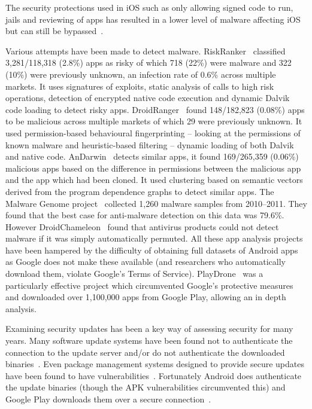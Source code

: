 \documentclass[conference,a4paper,twoside]{IEEEtran}
\begin{document}
The security protections used in iOS such as only allowing signed code to run, jails and reviewing of apps has resulted in a lower level of malware affecting iOS~\cite{TODO} but can still be bypassed~\cite{Wang2013a}. %

Various attempts have been made to detect malware.
RiskRanker~\cite{Grace2012a} classified 3,281/118,318 (2.8\%) apps as risky of which 718 (22\%) were malware and 322 (10\%) were previously unknown, an infection rate of 0.6\% across multiple markets.
It uses signatures of exploits, static analysis of calls to high risk operations, detection of encrypted native code execution and dynamic Dalvik code loading to detect risky apps.
DroidRanger~\cite{Zhou2012a} found 148/182,823 (0.08\%) apps to be malicious across multiple markets of which 29 were previously unknown.
It used permission-based behavioural fingerprinting -- looking at the permissions of known malware and heuristic-based filtering -- dynamic loading of both Dalvik and native code.
AnDarwin~\cite{Crussell2013} detects similar apps, it found 169/265,359 (0.06\%) malicious apps based on the difference in permissions between the malicious app and the app which had been cloned.
It used clustering based on semantic vectors derived from the program dependence graphs to detect similar apps.
The Malware Genome project~\cite{Zhou2012b} collected 1,260 malware samples from 2010--2011.
They found that the best case for anti-malware detection on this data was 79.6\%.
However DroidChameleon~\cite{Rastogi2013} found that antivirus products could not detect malware if it was simply automatically permuted.
All these app analysis projects have been hampered by the difficulty of obtaining full datasets of Android apps as Google does not make these available (and researchers who automatically download them, violate Google's Terms of Service).
PlayDrone~\cite{Viennot2014} was a particularly effective project which circumvented Google's protective measures and downloaded over 1,100,000 apps from Google Play, allowing an in depth analysis.

Examining security updates has been a key way of assessing security for many years.
Many software update systems have been found not to authenticate the connection to the update server and/or do not authenticate the downloaded binaries~\cite{Bellissimo2006}.
Even package management systems designed to provide secure updates have been found to have vulnerabilities~\cite{Cappos2008}.
Fortunately Android does authenticate the update binaries (though the APK vulnerabilities circumvented this) and Google Play downloads them over a secure connection~\cite{Viennot2014}. %
\end{document}
